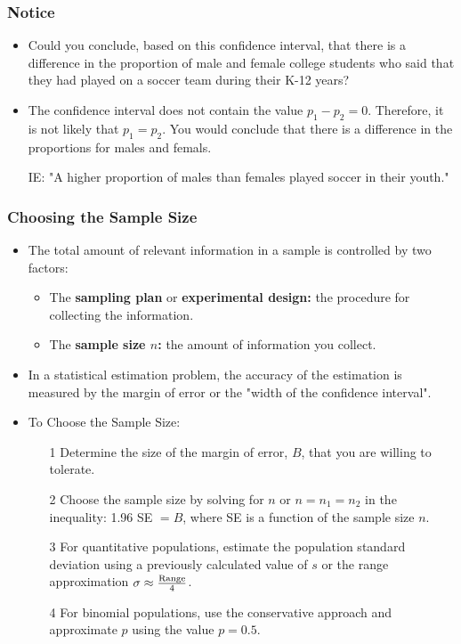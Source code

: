 \documentclass[12pt, letterpaper]{article}
\begin{document}
                \subsubsection*{Notice}
                    \begin{itemize}
                        \item Could you conclude, based on this confidence interval, that there is a difference in the proportion of male and female college students who said that they had played on a soccer team during their K-12 years?
                        \item The confidence interval does not contain the value $p_1 - p_2 = 0$. Therefore, it is not likely that $p_1 = p_2$. You would conclude that there is a difference in the proportions for males and femals.
                        \item[IE:] "A higher proportion of males than females played soccer in their youth."
                    \end{itemize}
            \subsubsection{Choosing the Sample Size}
                \begin{itemize}
                    \item The total amount of relevant information in a sample is controlled by two factors: 
                    \begin{itemize}
                        \item The \textbf{sampling plan} or \textbf{experimental design:} the procedure for collecting the information.
                        \item The \textbf{sample size $n$:} the amount of information you collect.
                    \end{itemize}
                    \item In a statistical estimation problem, the accuracy of the estimation is measured by the margin of error or the "width of the confidence interval".
                    \item To Choose the Sample Size: 
                    \begin{itemize}
                        \item[1] Determine the size of the margin of error, $B$, that you are willing to tolerate.
                        \item[2] Choose the sample size by solving for $n$ or $n = n_1 = n_2$ in the inequality: 1.96 SE $= B$, where SE is a function of the sample size $n$.
                        \item[3] For quantitative populations, estimate the population standard deviation using a previously calculated value of $s$ or the range approximation $\sigma \approx \frac{\textnormal{Range}}{4}$.
                        \item[4] For binomial populations, use the conservative approach and approximate $p$ using the value $p = 0.5$. 
                    \end{itemize}
                \end{itemize}
\end{document}
